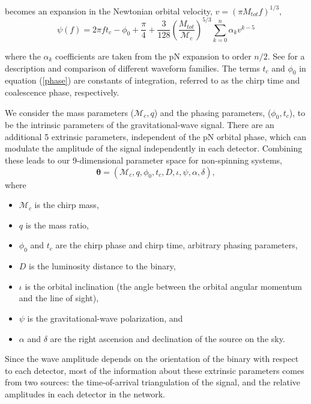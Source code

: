 \documentclass[11pt,a4paper]{emulateapj} 
\newcommand{\thpara}{\boldsymbol{\theta}}
\newcommand{\chmass}{\mathcal{M}_c}
\begin{document}
becomes an expansion in the Newtonian orbital velocity, $v=(\pi
M_{tot} f)^{1/3}$,
\begin{equation}
\psi(f) = 2 \pi f t_c - \phi_0 + \frac{\pi}{4} +
\frac{3}{128}\left(\frac{M_{tot}}{\chmass}\right)^{5/3}\sum^{n}_{k=0}\alpha_{k}v^{k-5}
\label{phase}
\end{equation}

\noindent where the $\alpha_{k}$ coefficients are taken from the pN
expansion to order $n/2$.  See \cite{BuonannoWaveform} for a
description and comparison of different waveform families.  The terms
$t_c$ and $\phi_0$ in equation (\ref{phase}) are constants of
integration, referred to as the chirp time and coalescence phase,
respectively.

We consider the mass parameters ($\chmass,q$) and the phasing
parameters, ($\phi_0,t_c$), to be the intrinsic parameters of the
gravitational-wave signal.  There are an additional 5 extrinsic
parameters, independent of the pN orbital phase, which can modulate
the amplitude of the signal independently in each
detector.  Combining these leads to our 9-dimensional parameter space
for non-spinning systems,
\begin{equation}
\thpara = (\chmass, q, \phi_0,t_c,D,\iota,\psi,\alpha,\delta),
\label{parameterspace}
\end{equation}
where

\begin{itemize}
\item $\chmass$ is the chirp mass,
\item $q$ is the mass ratio,
\item $\phi_0$ and $t_c$ are the chirp phase and chirp time, arbitrary
  phasing parameters,
\item $D$ is the luminosity distance to the binary,
\item $\iota$ is the orbital inclination (the angle between the
  orbital angular momentum and the line of sight),
\item $\psi$ is the gravitational-wave polarization, and
\item $\alpha$ and $\delta$ are the right ascension and declination of
  the source on the sky.
\end{itemize}
  Since the wave amplitude depends on the orientation of the binary
  with respect to each detector, most of the information about these
  extrinsic parameters comes from two sources: the time-of-arrival
  triangulation of the signal, and the relative amplitudes
  in each detector in the network.
  
\end{document}
